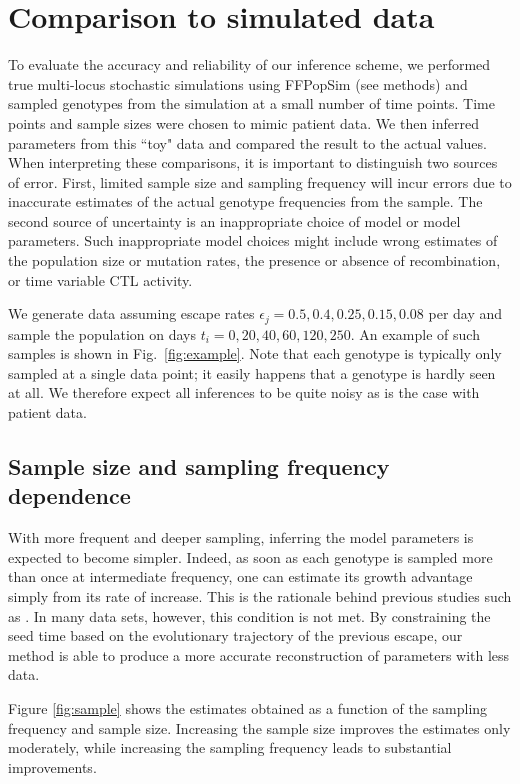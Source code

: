 \documentclass{frontiers}
\newcommand{\FIG}[1]{Fig.~\ref{fig:#1}}
\newcommand{\fcoeff}{\epsilon}
\begin{document}
\section*{Comparison to simulated data}
To evaluate the accuracy and reliability of our inference scheme, we
performed true multi-locus stochastic simulations using FFPopSim (see
methods) and sampled genotypes from the simulation at a small number of
time points. Time points and sample sizes were chosen to mimic patient
data. We then inferred parameters from this ``toy" data and compared the
result to the actual values. When interpreting these comparisons, it is
important to distinguish two sources of error.  First, limited sample
size and sampling frequency will incur errors due to inaccurate
estimates of the actual genotype frequencies from the sample. The second
source of uncertainty is an inappropriate choice of model or model
parameters. Such inappropriate model choices might include wrong
estimates of the population size or mutation rates, the presence or
absence of recombination, or time variable CTL activity.

We generate data assuming escape rates $\fcoeff_j = 0.5, 0.4,  0.25,
0.15, 0.08$ per day and sample the population on days $t_i=0,20,40,60,120,250$. An
example of such samples is shown in \FIG{example}. Note that each genotype
is typically only sampled at a single data point; it easily happens that
a genotype is hardly seen at all. We therefore expect all inferences to be quite
noisy as is the case with patient data.

\subsection{Sample size and sampling frequency dependence} 
With more frequent and deeper sampling, inferring the model parameters is
expected to become simpler. Indeed, as soon as each genotype is sampled more than
once at intermediate frequency, one can estimate its growth advantage simply
from its rate of increase. This is the rationale behind previous studies such as
\citep{Asquith:2006p28003,ganusov_fitness_2011}. In many data sets, however, this
condition is not met. By constraining the seed time based on the evolutionary
trajectory of the previous escape, our method is able to produce a more accurate
reconstruction of parameters with less data. 


Figure \ref{fig:sample} shows the estimates obtained as a function of the sampling
frequency and sample size. Increasing the sample size improves the estimates
only moderately, while increasing the sampling frequency leads to substantial
improvements.
\end{document}
